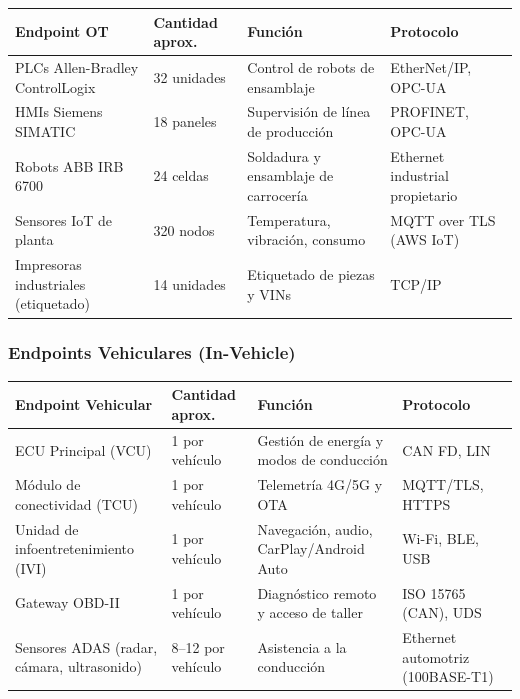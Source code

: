 \documentclass[letterpaper,11pt]{article}
\begin{document}
\vspace{0.2cm}
\begingroup
\small
{}
\begin{tabular}{|p{3.8cm}|p{3.5cm}|p{3.5cm}|p{2.5cm}|}
\hline
\rowcolor{orange!28}
\textbf{Endpoint OT} & \textbf{Cantidad aprox.} & \textbf{Función} & \textbf{Protocolo} \\
\hline
PLCs Allen-Bradley ControlLogix & 32 unidades & Control de robots de ensamblaje & EtherNet/IP, OPC-UA \\
\hline
HMIs Siemens SIMATIC & 18 paneles & Supervisión de línea de producción & PROFINET, OPC-UA \\
\hline
Robots ABB IRB 6700 & 24 celdas & Soldadura y ensamblaje de carrocería & Ethernet industrial propietario \\
\hline
Sensores IoT de planta & 320 nodos & Temperatura, vibración, consumo & MQTT over TLS (AWS IoT) \\
\hline
Impresoras industriales (etiquetado) & 14 unidades & Etiquetado de piezas y VINs & TCP/IP \\
\hline
\end{tabular}
\endgroup

\subsubsection{Endpoints Vehiculares (In-Vehicle)}

\vspace{0.2cm}
\begingroup
\small
{}
\begin{tabular}{|p{3.8cm}|p{3.5cm}|p{3.5cm}|p{2.5cm}|}
\hline
\rowcolor{red!18}
\textbf{Endpoint Vehicular} & \textbf{Cantidad aprox.} & \textbf{Función} & \textbf{Protocolo} \\
\hline
ECU Principal (VCU) & 1 por vehículo & Gestión de energía y modos de conducción & CAN FD, LIN \\
\hline
Módulo de conectividad (TCU) & 1 por vehículo & Telemetría 4G/5G y OTA & MQTT/TLS, HTTPS \\
\hline
Unidad de infoentretenimiento (IVI) & 1 por vehículo & Navegación, audio, CarPlay/Android Auto & Wi-Fi, BLE, USB \\
\hline
Gateway OBD-II & 1 por vehículo & Diagnóstico remoto y acceso de taller & ISO 15765 (CAN), UDS \\
\hline
Sensores ADAS (radar, cámara, ultrasonido) & 8--12 por vehículo & Asistencia a la conducción & Ethernet automotriz (100BASE-T1) \\
\hline
\end{tabular}
\endgroup
\end{document}
